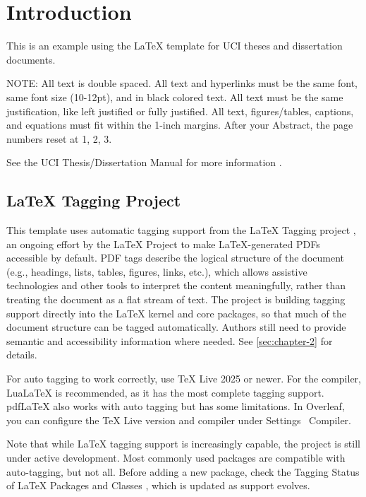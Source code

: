 \chapter{Introduction}


This is an example using the \LaTeX{} template for UCI theses and
dissertation documents. 

NOTE: All text is double spaced. All text and hyperlinks must be the same font, same font size (10-12pt), and in black colored text. All text must be the same justification, like left justified or fully justified. All text, figures/tables, captions, and equations must fit within the 1-inch margins. 
After your Abstract, the page numbers reset at 1, 2, 3.


See the UCI Thesis/Dissertation Manual for more information \cite{uci_thesis_manual}.


\section{\LaTeX{} Tagging Project}

This template uses automatic tagging support from the \LaTeX{} Tagging project \cite{latex_tagging_instructions}, an ongoing effort by the \LaTeX{} Project to make \LaTeX{}-generated PDFs accessible by default. PDF tags describe the logical structure of the document (e.g., headings, lists, tables, figures, links, etc.), which allows assistive technologies and other tools to interpret the content meaningfully, rather than treating the document as a flat stream of text. The project is building tagging support directly into the \LaTeX{} kernel and core packages, so that much of the document structure can be tagged automatically. Authors still need to provide semantic and accessibility information where needed. See \autoref{sec:chapter-2} for details.

For auto tagging to work correctly, use \TeX{} Live 2025 or newer. For the compiler, Lua\LaTeX{} is recommended, as it has the most complete tagging support. pdf\LaTeX{} also works with auto tagging but has some limitations. In Overleaf, you can configure the \TeX{} Live version and compiler under Settings \textrightarrow\ Compiler.

Note that while \LaTeX{} tagging support is increasingly capable, the project is still under active development. Most commonly used packages are compatible with auto-tagging, but not all. Before adding a new package, check the Tagging Status of \LaTeX{} Packages and Classes \cite{latex_tagging_status}, which is updated as support evolves.




